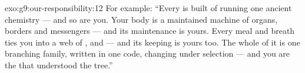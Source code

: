 \begin{solution}{exo:g9:our-responsibility:12}
For example: ``Every  is built of 
running one ancient chemistry --- and so are you. Your
body is a maintained machine of organs, borders and
messengers --- and its maintenance is yours. Every meal
and breath ties you into a web of , 
and  --- and its keeping is yours too. The
whole of it is one branching family, written in one
code, changing under selection --- and you are the
 that understood the tree.''
\end{solution}

